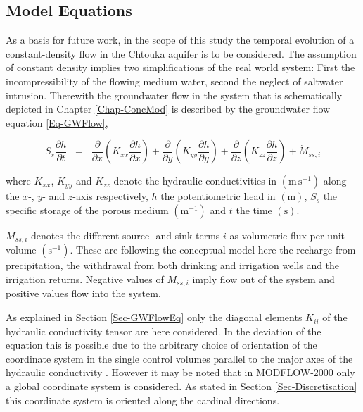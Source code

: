 
\subsection{Model Equations}
\label{Sec-ModEq}

As a basis for future work, in the scope of this study the temporal evolution of a constant-density flow in the Chtouka aquifer is to be considered. 
The assumption of constant density implies two simplifications of the real world system: First the incompressibility of the flowing medium water, second the neglect of saltwater intrusion. 
Therewith the groundwater flow in the system that is schematically depicted in Chapter \ref{Chap-ConcMod} is described by the groundwater flow equation \eqref{Eq-GWFlow},

\begin{equation}
    S_s \frac{\partial h}{\partial t} \; \; = \; \; \frac{\partial}{\partial x} \left(K_{xx} \frac{\partial h}{\partial x} \right) + \frac{\partial}{\partial y} \left(K_{yy} \frac{\partial h}{\partial y} \right) + \frac{\partial}{\partial z} \left(K_{zz} \frac{\partial h}{\partial z} \right) + \dot{M}_{ss,i}
\end{equation}

where $K_{xx}$, $K_{yy}$ and $K_{zz}$ denote the hydraulic conductivities in $\left( \textrm{m} \, \textrm{s}^{-1} \right)$ along the $x$-, $y$- and $z$-axis respectively, $h$ the potentiometric head in $\left( \textrm{m} \right)$, $S_s$ the specific storage of the porous medium $\left( \textrm{m}^{-1} \right)$ and $t$ the time $\left( \textrm{s} \right)$.

$\dot{M}_{ss,i}$ denotes the different source- and sink-terms $i$ as volumetric flux per unit volume $\left( \textrm{s}^{-1} \right)$. 
These are following the conceptual model here the recharge from precipitation, the withdrawal from both drinking and irrigation wells and the irrigation returns. 
Negative values of $M_{ss,i}$ imply flow out of the system and positive values flow into the system.

As explained in Section \ref{Sec-GWFlowEq} only the diagonal elements $K_{ii}$ of the hydraulic conductivity tensor are here considered. 
In the deviation of the equation this is possible due to the arbitrary choice of orientation of the coordinate system in the single control volumes parallel to the major axes of the hydraulic conductivity \parencite{Harbaugh.2000}. 
However it may be noted that in MODFLOW-2000 only a global coordinate system is considered. 
As stated in Section \ref{Sec-Discretisation} this coordinate system is oriented along the cardinal directions.

